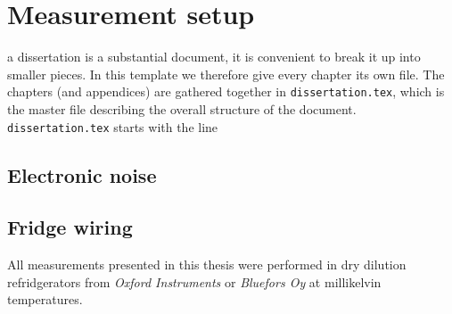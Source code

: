 \section{Measurement setup}

 a dissertation is a substantial document, it is convenient to break it up into smaller pieces. In this template we therefore give every chapter its own file. The chapters (and appendices) are gathered together in \texttt{dissertation.tex}, which is the master file describing the overall structure of the document. \texttt{dissertation.tex} starts with the line

\subsection{Electronic noise}

\subsection{Fridge wiring}

All measurements presented in this thesis were performed in dry dilution refridgerators from \textit{Oxford Instruments} or \textit{Bluefors Oy} at millikelvin temperatures.

